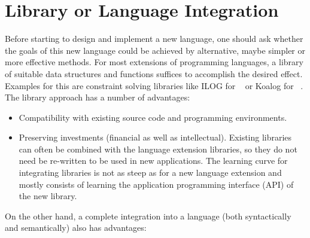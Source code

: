 \section{Library or Language Integration}

Before starting to design and implement a new language, one should ask
whether the goals of this new language could be achieved by
alternative, maybe simpler or more effective methods.  For most
extensions of programming languages, a library of suitable data
structures and functions suffices to accomplish the desired effect.
Examples for this are constraint solving libraries like ILOG for
\cplusplus{}~\cite{ILOG} or Koalog for \java{}~\cite{koalog}.  The
library approach has a number of advantages:

\begin{itemize}
\item Compatibility with existing source code and programming
  environments.
  
\item Preserving investments (financial as well as intellectual).
  Existing libraries can often be combined with the language extension
  libraries, so they do not need be re-written to be used in new
  applications.  The learning curve for integrating libraries is not
  as steep as for a new language extension and mostly consists of
  learning the application programming interface (API) of the new
  library.
\end{itemize}

\noindent
On the other hand, a complete integration into a language (both
syntactically and semantically) also has advantages:

